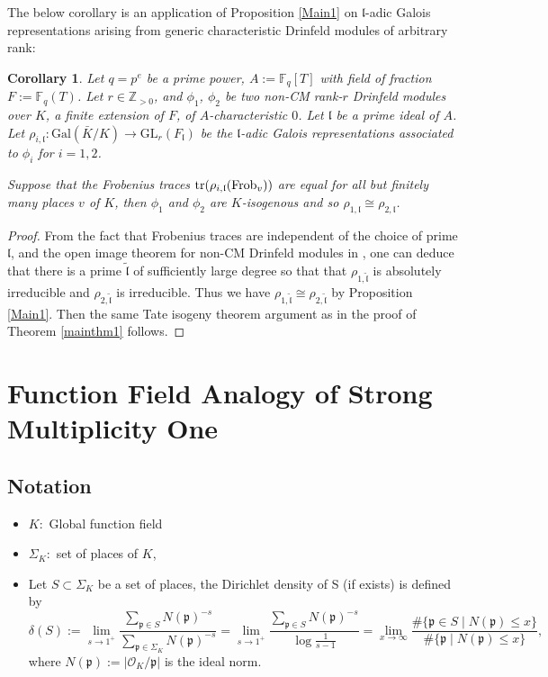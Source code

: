 \documentclass[20pt, oneside]{article}   	%
\newtheorem{cor}[thm]{Corollary}
\theoremstyle{definition}
\newcommand{\F}{\mathbb{F}}
\newcommand{\fl}{\mathfrak{l}}
\newcommand{\fp}{\mathfrak{p}}
\newcommand{\Gal}{\mathrm{Gal}}
\newcommand{\GL}{\mathrm{GL}}
\newcommand{\cO}{\mathcal{O}}
\begin{document}
The below corollary is an application of Proposition \ref{Main1} on $\fl$-adic Galois representations arising from generic characteristic Drinfeld modules of arbitrary rank:

\begin{cor}\label{corr}
Let $q=p^e$ be a prime power, $A:=\F_q[T]$ with field of fraction $F:=\F_q(T)$. Let $r\in \mathbb{Z}_{>0}$, and $\phi_1$, $\phi_2$ be two non-CM rank-$r$ Drinfeld modules over $K$, a finite extension of $F$, of $A$-characteristic $0$. Let $\fl$ be a prime ideal of $A$. Let $\rho_{i,\fl}:\Gal(\bar{K}/K)\rightarrow \GL_r(F_\fl)$  be the $\fl$-adic Galois representations associated to $\phi_i$ for $i=1,2$. 

Suppose that the Frobenius traces ${\rm{tr}}(\rho_{i,\fl}({\rm Frob}_{v}))$ are equal for all but finitely many places $v$ of $K$, then
$\phi_1$ and $\phi_2$ are $K$-isogenous and so $\rho_{1,\fl}\cong\rho_{2,\fl}$.

\end{cor}

\begin{proof}
 
From the fact that Frobenius traces are independent of the choice of prime $\fl$, and the  open image theorem for non-CM Drinfeld modules in \cite{PR09}, one can  deduce that there is a prime $\tilde{\fl}$ of sufficiently large degree so that that $\rho_{1,\tilde{\fl}}$ is absolutely irreducible and $\rho_{2,\tilde{\fl}}$ is irreducible. Thus we have $\rho_{1,\tilde{\fl}}\cong\rho_{2,\tilde{\fl}}$ by Proposition \ref{Main1}. Then the same Tate isogeny theorem argument as in the proof of Theorem \ref{mainthm1} follows.



\end{proof}

\section{Function Field Analogy of Strong Multiplicity One}

\subsection{Notation}

\begin{itemize}
\item $K:$ Global function field
\item $\Sigma_K:$ set of places of $K$, 
\item Let $S\subset \Sigma_K$ be a set of places, the Dirichlet density of S (if exists) is defined by
$$\delta(S):=\lim_{s\rightarrow 1^+}\frac{\sum_{\fp\in S}N(\fp)^{-s}}{\sum_{\fp\in \Sigma_K}N(\fp)^{-s}}=\lim_{s\rightarrow 1^+}\frac{\sum_{\fp\in S}N(\fp)^{-s}}{\log \frac{1}{s-1}}=\lim_{x\rightarrow \infty}\frac{\#\{\fp\in S\mid N(\fp)\leqslant x\}}{\#\{\fp\mid N(\fp)\leqslant x\}},$$
where $N(\fp):=|\cO_K/\fp|$ is the ideal norm.
\end{itemize}
\end{document}
